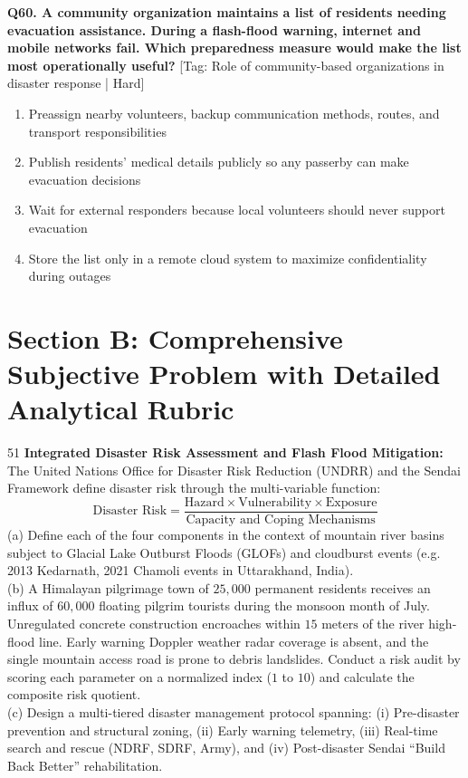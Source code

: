 \noindent\textbf{Q60. A community organization maintains a list of residents needing evacuation assistance. During a flash-flood warning, internet and mobile networks fail. Which preparedness measure would make the list most operationally useful?} \hfill [Tag: Role of community-based organizations in disaster response | Hard]
\begin{enumerate}[label=(\alph*),topsep=2pt,itemsep=1pt,partopsep=0pt,parsep=0pt]
    \item {Preassign nearby volunteers, backup communication methods, routes, and transport responsibilities}
    \item {Publish residents' medical details publicly so any passerby can make evacuation decisions}
    \item {Wait for external responders because local volunteers should never support evacuation}
    \item {Store the list only in a remote cloud system to maximize confidentiality during outages}
\end{enumerate}
\vspace{2mm}


\section{Section B: Comprehensive Subjective Problem with Detailed Analytical Rubric}

\begin{subjectiveq}{5}{1}
\textbf{Integrated Disaster Risk Assessment and Flash Flood Mitigation:}\\The United Nations Office for Disaster Risk Reduction (UNDRR) and the Sendai Framework define disaster risk through the multi-variable function:\begin{equation}\text{Disaster Risk} = \frac{\text{Hazard} \times \text{Vulnerability} \times \text{Exposure}}{\text{Capacity and Coping Mechanisms}}\end{equation}(a) Define each of the four components in the context of mountain river basins subject to Glacial Lake Outburst Floods (GLOFs) and cloudburst events (e.g. 2013 Kedarnath, 2021 Chamoli events in Uttarakhand, India).\\(b) A Himalayan pilgrimage town of $25{,}000$ permanent residents receives an influx of $60{,}000$ floating pilgrim tourists during the monsoon month of July. Unregulated concrete construction encroaches within $15\text{ meters}$ of the river high-flood line. Early warning Doppler weather radar coverage is absent, and the single mountain access road is prone to debris landslides. Conduct a risk audit by scoring each parameter on a normalized index ($1$ to $10$) and calculate the composite risk quotient.\\(c) Design a multi-tiered disaster management protocol spanning: (i) Pre-disaster prevention and structural zoning, (ii) Early warning telemetry, (iii) Real-time search and rescue (NDRF, SDRF, Army), and (iv) Post-disaster Sendai ``Build Back Better'' rehabilitation.
\end{subjectiveq}

